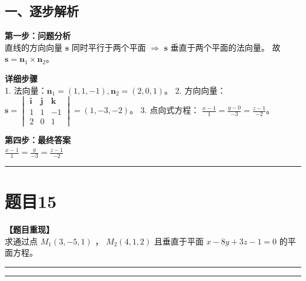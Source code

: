 \documentclass[12pt, a4paper]{ctexart}
\newcommand{\TopSeparator}{
    \par\noindent\rule{\textwidth}{1.5pt}\vspace{0.5em} %
}
\newcommand{\AnalysisSeparator}{
    \par\noindent\rule{\textwidth}{0.5pt}\vspace{0.2em}\hrule\vspace{0.5em} %
}
\newenvironment{RedAnalysis}{
    \par
    \color{red} %
}{
    \par
    \color{black} %
}
\begin{document}
\begin{RedAnalysis}

\subsection*{一、逐步解析}

\textbf{第一步：问题分析} \\
直线的方向向量 $\mathbf{s}$ 同时平行于两个平面 $\Rightarrow$ $\mathbf{s}$ 垂直于两个平面的法向量。
故 $\mathbf{s} = \mathbf{n}_1 \times \mathbf{n}_2$。

\textbf{详细步骤} \\
1. 法向量：$\mathbf{n}_1 = (1,1,-1), \mathbf{n}_2 = (2,0,1)$。
2. 方向向量：
   $\mathbf{s} = \begin{vmatrix} \mathbf{i} & \mathbf{j} & \mathbf{k} \\ 1 & 1 & -1 \\ 2 & 0 & 1 \end{vmatrix} = (1, -3, -2)$。
3. 点向式方程：
   $\frac{x-1}{1} = \frac{y-0}{-3} = \frac{z-1}{-2}$。

\textbf{第四步：最终答案} \\
$ \frac{x-1}{1} = \frac{y}{-3} = \frac{z-1}{-2} $

\end{RedAnalysis}

\vspace{2em}

\TopSeparator
\section*{题目15}

\textbf{【题目重现】} \\
求通过点 $ M_{1}(3,-5,1) $ ， $ M_{2}(4,1,2) $ 且垂直于平面 $ x-8y+3z-1=0 $ 的平面方程。

\AnalysisSeparator
\end{document}
